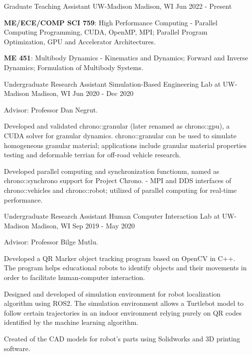\begin{cventries}
	\cventry
	{Graduate Teaching Assistant} %
	{UW-Madison} %
	{Madison, WI} %
	{Jun 2022 - Present} %
	{
		\begin{cvitems} %
			\item {\textbf{ME/ECE/COMP SCI 759}: High Performance Computing - Parallel Computing Programming, CUDA, OpenMP, MPI; Parallel Program Optimization, GPU and Accelerator Architectures.}
			\item {\textbf{ME 451}: Multibody Dynamics - Kinematics and Dynamics; Forward and Inverse Dynamics; Formulation of Multibody Systems.}
		\end{cvitems}
	}
		
	

  \cventry
	{Undergraduate Research Assistant} %
	{Simulation-Based Engineering Lab at UW-Madison} %
	{Madison, WI} %
	{Jun 2020 - Dec 2020} %
	{
		\begin{cvitems} %
			\item {Advisor: Professor Dan Negrut.}
			\item {Developed and validated chrono::granular (later renamed as chrono::gpu), a CUDA solver for granular dynamics. chrono::granular can be used to simulate homogeneous granular material; applications include granular material properties testing and deformable terrian for off-road vehicle research.}
			\item {Developed parallel computing and synchronization functionm, named as chrono::synchrono support for Project Chrono. - MPI and DDS interfaces of chrono::vehicles and chrono::robot; utilized of parallel computing for real-time performance.}
		\end{cvitems}
	}



  \cventry
	{Undergraduate Research Assistant} %
	{Human Computer Interaction Lab at UW-Madison} %
	{Madison, WI} %
	{Sep 2019 - May 2020} %
	{
	  \begin{cvitems} %
		\item {Advisor: Professor Bilge Mutlu.}
		\item {Developed a QR Marker object tracking program based on OpenCV in C++. The program helps educational robots to identify objects and their movements in order to facilitate human-computer interaction.}
		\item {Designed and developed of simulation environment for robot localization algorithm using ROS2. The simulation environment allows a Turtlebot model to follow certain trajectories in an indoor environment relying purely on QR codes identified by the machine learning algorithm.}
		\item {Created of the CAD models for robot's parts  using Solidworks and 3D printing software.}
	  \end{cvitems}
}



\end{cventries}

